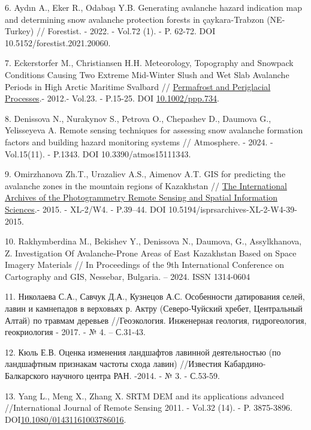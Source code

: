 6. Aydın A., Eker R., Odabaşı Y.B. Generating avalanche hazard
indication map and determining snow avalanche protection forests in
çaykara-Trabzon (NE-Turkey) // Forestist. - 2022. - Vol.72 (1). - P.
62-72. DOI 10.5152/forestist.2021.20060.

7. Eckerstorfer M., Christiansen H.H. Meteorology, Topography and
Snowpack Conditions Causing Two Extreme Mid-Winter Slush and Wet Slab
Avalanche Periods in High Arctic Maritime Svalbard //
\href{https://www.researchgate.net/journal/Permafrost-and-Periglacial-Processes-1099-1530?_tp=eyJjb250ZXh0Ijp7ImZpcnN0UGFnZSI6InB1YmxpY2F0aW9uIiwicGFnZSI6InB1YmxpY2F0aW9uIn19}{Permafrost
and Periglacial Processes}.- 2012.- Vol.23. - P.15-25. DOI
\href{http://dx.doi.org/10.1002/ppp.734}{10.1002/ppp.734}.

8. Denissova N., Nurakynov S., Petrova O., Chepashev D., Daumova G.,
Yelisseyeva A. Remote sensing techniques for assessing snow avalanche
formation factors and building hazard monitoring systems // Atmosphere.
- 2024. - Vol.15(11). - P.1343. DOI 10.3390/atmos15111343.

9. Omirzhanova Zh.T., Urazaliev A.S., Aimenov A.T. GIS for predicting
the avalanche zones in the mountain regions of Kazakhstan //
\href{https://www.researchgate.net/journal/The-International-Archives-of-the-Photogrammetry-Remote-Sensing-and-Spatial-Information-Sciences-2194-9034?_tp=eyJjb250ZXh0Ijp7ImZpcnN0UGFnZSI6InB1YmxpY2F0aW9uIiwicGFnZSI6InB1YmxpY2F0aW9uIn19}{The
International Archives of the Photogrammetry Remote Sensing and Spatial
Information Sciences}.- 2015. - XL-2/W4. - P.39--44. DOI
10.5194/isprsarchives-XL-2-W4-39-2015.

10. Rakhymberdina M., Bekishev Y., Denissova N., Daumova, G.,
Assylkhanova, Z. Investigation Of Avalanche-Prone Areas of East
Kazakhstan Based on Space Imagery Materials // In Proceedings of the 9th
International Conference on Cartography and GIS, Nessebar, Bulgaria. --
2024. ISSN 1314-0604

11. Николаева С.А., Савчук Д.А., Кузнецов А.С. Особенности датирования
селей, лавин и камнепадов в верховьях р. Актру (Северо-Чуйский хребет,
Центральный Алтай) по травмам деревьев //Геоэкология. Инженерная
геология, гидрогеология, геокриология - 2017. - № 4. -- С.31-43.

12. Кюль Е.В. Оценка изменения ландшафтов лавинной деятельностью (по
ландшафтным признакам частоты схода лавин) //Известия
Кабардино-Балкарского научного центра РАН. -2014. - № 3. - С.53-59.

13. Yang L., Meng X., Zhang X. SRTM DEM and its applications advanced
//International Journal of Remote Sensing 2011. - Vol.32 (14). - P.
3875-3896.
DOI\href{http://dx.doi.org/10.1080/01431161003786016}{10.1080/01431161003786016}.

